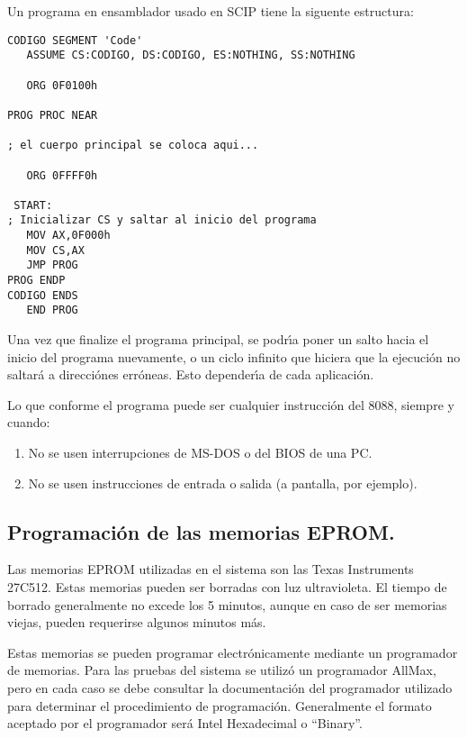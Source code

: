 Un programa en ensamblador usado en SCIP tiene la siguente estructura:

\begin{verbatim}
CODIGO SEGMENT 'Code'
   ASSUME CS:CODIGO, DS:CODIGO, ES:NOTHING, SS:NOTHING

   ORG 0F0100h

PROG PROC NEAR  

; el cuerpo principal se coloca aqui...

   ORG 0FFFF0h

 START:                 
; Inicializar CS y saltar al inicio del programa
   MOV AX,0F000h
   MOV CS,AX
   JMP PROG
PROG ENDP
CODIGO ENDS
   END PROG
\end{verbatim}

Una vez que finalize el programa principal, se podr\'{\i}a poner un salto hacia el inicio del %
programa nuevamente, o un ciclo infinito que hiciera que la ejecuci\'on no saltar\'a a %
direcci\'ones err\'oneas. Esto depender\'{\i}a de cada aplicaci\'on.

Lo que conforme el programa puede ser cualquier instrucci\'on del 8088, siempre y cuando:

\begin{enumerate}
\item No se usen interrupciones de MS-DOS o del BIOS de una PC.
\item No se usen instrucciones de entrada o salida (a pantalla, por ejemplo).
\end{enumerate}


\subsection{Programaci\'on de las memorias EPROM.}
\label{Subsection:progmem}

Las memorias EPROM utilizadas en el sistema son las Texas Instruments 27C512. Estas memorias %
pueden ser borradas con luz ultravioleta. El tiempo de borrado generalmente no excede los 5 %
minutos, aunque en caso de ser memorias viejas, pueden requerirse algunos minutos m\'as.

Estas memorias se pueden programar electr\'onicamente mediante un programador de memorias. Para %
las pruebas del sistema se utiliz\'o un programador AllMax, pero en cada caso se debe consultar %
la documentaci\'on del programador utilizado para determinar el procedimiento de %
programaci\'on. Generalmente el formato aceptado por el programador ser\'a Intel Hexadecimal o %
``Binary''.

